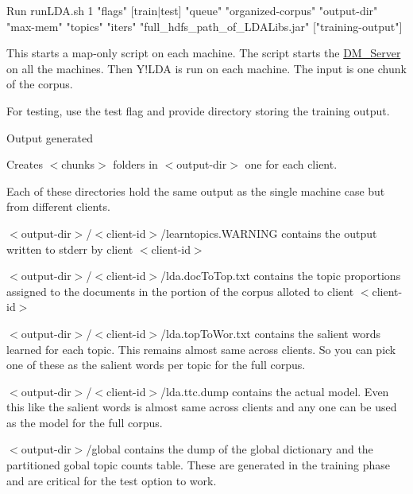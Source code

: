\begin{DoxyEnumerate}
\begin{DoxyEnumerate}
\begin{DoxyEnumerate}
Run {\ttfamily runLDA.sh 1 "flags" \mbox{[}train$|$test\mbox{]} "queue" "organized-\/corpus" "output-\/dir" "max-\/mem" "topics" "iters" "full\_\-hdfs\_\-path\_\-of\_\-LDALibs.jar" \mbox{[}"training-\/output"\mbox{]} }  
\item 

This starts a map-\/only script on each machine. The script starts the \hyperlink{class_d_m___server}{DM\_\-Server} on all the machines. Then Y!LDA is run on each machine. The input is one chunk of the corpus. 
\item 

For testing, use the test flag and provide directory storing the training output. 
\end{DoxyEnumerate}
\item 

Output generated 
\begin{DoxyEnumerate}
\item 

Creates $<$chunks$>$ folders in $<$output-\/dir$>$ one for each client.  
\item 

Each of these directories hold the same output as the single machine case but from different clients.  
\item 

$<$output-\/dir$>$/$<$client-\/id$>$/learntopics.WARNING contains the output written to stderr by client $<$client-\/id$>$ 
\item 

$<$output-\/dir$>$/$<$client-\/id$>$/lda.docToTop.txt contains the topic proportions assigned to the documents in the portion of the corpus alloted to client $<$client-\/id$>$ 
\item 

$<$output-\/dir$>$/$<$client-\/id$>$/lda.topToWor.txt contains the salient words learned for each topic. This remains almost same across clients. So you can pick one of these as the salient words per topic for the full corpus. 
\item 

$<$output-\/dir$>$/$<$client-\/id$>$/lda.ttc.dump contains the actual model. Even this like the salient words is almost same across clients and any one can be used as the model for the full corpus. 
\item 

$<$output-\/dir$>$/global contains the dump of the global dictionary and the partitioned gobal topic counts table. These are generated in the training phase and are critical for the test option to work. 
\end{DoxyEnumerate}
\item 


\end{DoxyEnumerate}
\end{DoxyEnumerate}
